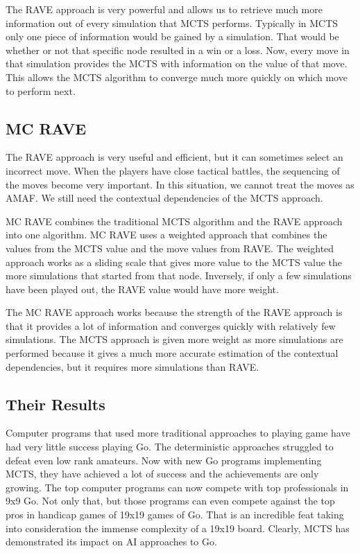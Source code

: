 \documentclass{sig-alternate}
\begin{document}
The RAVE approach is very powerful and allows us to retrieve much more information out of every simulation that MCTS performs. Typically in MCTS only one piece of information would be gained by a simulation. That would be whether or not that specific node resulted in a win or a loss. Now, every move in that simulation provides the MCTS with information on the value of that move. This allows the MCTS algorithm to converge much more quickly on which move to perform next.

\subsection{MC RAVE}
The RAVE approach is very useful and efficient, but it can sometimes select an incorrect move\cite{RAVEinGo}. When the players have close tactical battles, the sequencing of the moves become very important. In this situation, we cannot treat the moves as AMAF. We still need the contextual dependencies of the MCTS approach.

MC RAVE combines the traditional MCTS algorithm and the RAVE approach into one algorithm. MC RAVE uses a weighted approach that combines the values from the MCTS value and the move values from RAVE. The weighted approach works as a sliding scale that gives more value to the MCTS value the more simulations that started from that node\cite{RAVEinGo}. Inversely, if only a few simulations have been played out, the RAVE value would have more weight.

The MC RAVE approach works because the strength of the RAVE approach is that it provides a lot of information and converges quickly with relatively few simulations. The MCTS approach is given more weight as more simulations are performed because it gives a much more accurate estimation of the contextual dependencies, but it requires more simulations than RAVE.

\subsection{Their Results}
Computer programs that used more traditional approaches to playing game have had very little success playing Go. The deterministic approaches struggled to defeat even low rank amateurs. Now with new Go programs implementing MCTS, they have achieved a lot of success and the achievements are only growing. The top computer programs can now compete with top professionals in 9x9 Go\cite{RAVEinGo}. Not only that, but those programs can even compete against the top pros in handicap games of 19x19 games of Go. That is an incredible feat taking into consideration the immense complexity of a 19x19 board. Clearly, MCTS has demonstrated its impact on AI approaches to Go.
\end{document}
